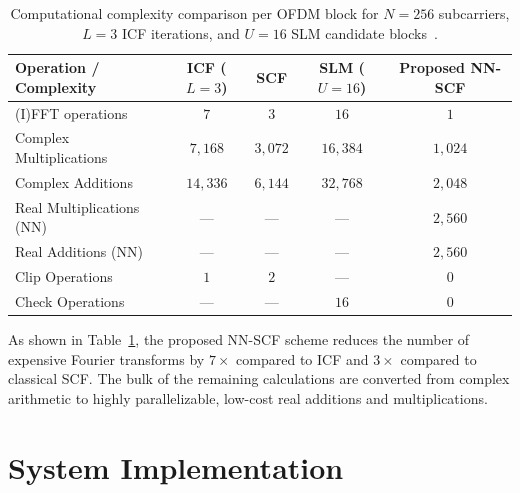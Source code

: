 \begin{table}[H]
    \centering
    \caption{Computational complexity comparison per OFDM block for $N = 256$ subcarriers, $L = 3$ ICF iterations, and $U = 16$ SLM candidate blocks~\cite{sohn2015neural}.}
    \label{tab:scf_complexity}
    \begin{tabular}{l c c c c}
        \toprule
        \textbf{Operation / Complexity} & \textbf{ICF ($L=3$)} & \textbf{SCF} & \textbf{SLM ($U=16$)} & \textbf{Proposed NN-SCF} \\
        \midrule
        (I)FFT operations               & $7$                  & $3$          & $16$                  & $1$                      \\
        Complex Multiplications         & $7{,}168$            & $3{,}072$    & $16{,}384$            & $1{,}024$                \\
        Complex Additions               & $14{,}336$           & $6{,}144$    & $32{,}768$            & $2{,}048$                \\
        Real Multiplications (NN)       & —                    & —            & —                     & $2{,}560$                \\
        Real Additions (NN)             & —                    & —            & —                     & $2{,}560$                \\
        Clip Operations                 & $1$                  & $2$          & —                     & $0$                      \\
        Check Operations                & —                    & —            & $16$                  & $0$                      \\
        \bottomrule
    \end{tabular}
\end{table}

As shown in Table~\ref{tab:scf_complexity}, the proposed NN-SCF scheme reduces the number of expensive Fourier transforms by $7\times$ compared to ICF and $3\times$ compared to classical SCF. The bulk of the remaining calculations are converted from complex arithmetic to highly parallelizable, low-cost real additions and multiplications.

\section{System Implementation}
\label{sec:nnscf_implementation}


